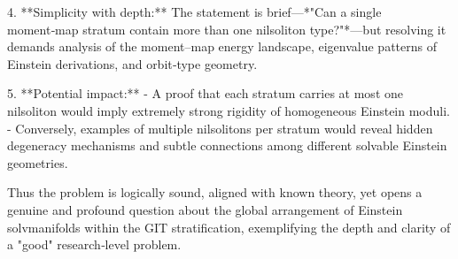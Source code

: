 4. **Simplicity with depth:**  
   The statement is brief—*"Can a single moment‑map stratum contain more than one nilsoliton type?"*—but resolving it demands analysis of the moment–map energy landscape, eigenvalue patterns of Einstein derivations, and orbit‑type geometry.

5. **Potential impact:**  
   - A proof that each stratum carries at most one nilsoliton would imply extremely strong rigidity of homogeneous Einstein moduli.  
   - Conversely, examples of multiple nilsolitons per stratum would reveal hidden degeneracy mechanisms and subtle connections among different solvable Einstein geometries.

Thus the problem is logically sound, aligned with known theory, yet opens a genuine and profound question about the global arrangement of Einstein solvmanifolds within the GIT stratification, exemplifying the depth and clarity of a "good" research‑level problem.